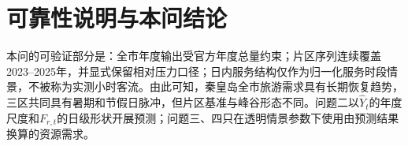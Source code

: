 \documentclass[UTF8,12pt,a4paper]{ctexart}
\begin{document}
\section{可靠性说明与本问结论}
本问的可验证部分是：全市年度输出受官方年度总量约束；片区序列连续覆盖2023--2025年，并显式保留相对压力口径；日内服务结构仅作为归一化服务时段情景，不被称为实测小时客流。由此可知，秦皇岛全市旅游需求具有长期恢复趋势，三区共同具有暑期和节假日脉冲，但片区基准与峰谷形态不同。问题二以$\widehat Y_t$的年度尺度和$F_{r,t}$的日级形状开展预测；问题三、四只在透明情景参数下使用由预测结果换算的资源需求。
\end{document}
